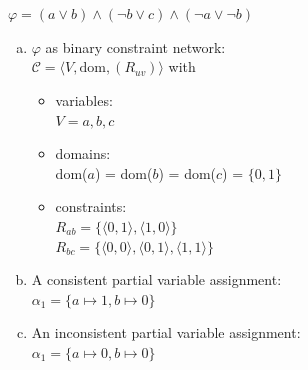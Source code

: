 \documentclass{article} %
\begin{document}
\newpage
\section{}
$\varphi = (a \lor b) \land (\neg b \lor c) \land (\neg a \lor \neg b)$
\begin{enumerate}[(a)]
    \item $\varphi$ as binary constraint network:\\[0.5em]
    $\mathcal{C} = \langle V, \text{dom}, (R_{uv}) \rangle$ with
    \begin{itemize}
        \item variables:\\[0.5em]
        $V = a, b, c$
        \item domains:\\[0.5em]
        dom($a$) = dom($b$) = dom($c$) = $\{ 0, 1 \}$
        \item constraints:\\[0.5em]
        $R_{ab} = \{
            \langle 0, 1 \rangle,
            \langle 1, 0 \rangle
        \}$\\[0.5em]
        $R_{bc} = \{
            \langle 0, 0 \rangle,
            \langle 0, 1 \rangle,
            \langle 1, 1 \rangle
        \}$
    \end{itemize}
    \item A consistent partial variable assignment:\\[0.5em]
    $\alpha_1 = \{ a \mapsto 1, b \mapsto 0 \}$
    \item An inconsistent partial variable assignment:\\[0.5em]
    $\alpha_1 = \{ a \mapsto 0, b \mapsto 0 \}$
\end{enumerate}
\end{document}
